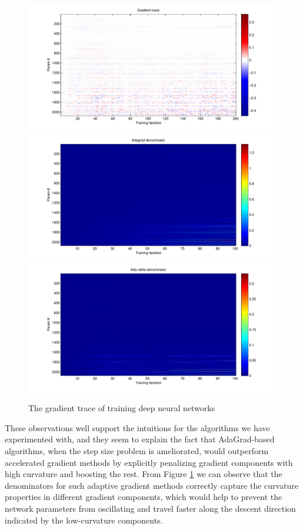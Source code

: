 \begin{figure}
{\centering
\includegraphics[width=0.9\linewidth]{ppt1}\\
\includegraphics[width=0.9\linewidth]{ppt2}\\
\includegraphics[width=0.9\linewidth]{ppt3}}
\caption{The gradient trace of training deep neural networks}\label{fig:grad_trace}
\end{figure}

These observations well support the intuitions for the algorithms we have experimented
with, and they seem to explain the fact that AdaGrad-based algorithms, when the step size 
problem is ameliorated, would outperform accelerated gradient methods by explicitly 
penalizing gradient components with high curvature and boosting the rest. From Figure 
\ref{fig:grad_trace} we can observe that the denominators for such adaptive gradient 
methods correctly capture the curvature properties in different gradient components, 
which would help to prevent the network parameters from oscillating and travel faster 
along the descent direction indicated by the low-curvature components.